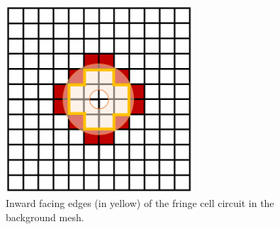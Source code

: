 \begin{figure}[H]
	\centering
	\includegraphics[height=7.0cm]{figs/overset/inward_facing_edges.png}
    \caption{Inward facing edges (in yellow) of the fringe cell circuit in the background mesh.}
    \label{fig:inward_facing_edges}
\end{figure}


